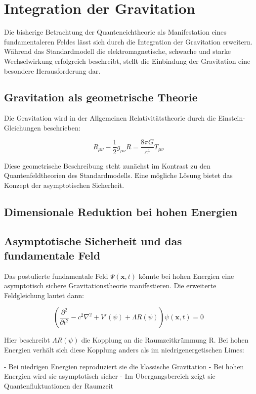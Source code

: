 \documentclass{article}
\begin{document}
\section{Integration der Gravitation}
Die bisherige Betrachtung der Quanteneichtheorie als Manifestation eines fundamentaleren Feldes lässt sich durch die Integration der Gravitation erweitern. Während das Standardmodell die elektromagnetische, schwache und starke Wechselwirkung erfolgreich beschreibt, stellt die Einbindung der Gravitation eine besondere Herausforderung dar.

\subsection{Gravitation als geometrische Theorie}
Die Gravitation wird in der Allgemeinen Relativitätstheorie durch die Einstein-Gleichungen beschrieben:

\begin{equation}
	R_{\mu\nu} - \frac{1}{2} g_{\mu\nu} R = \frac{8\pi G}{c^4} T_{\mu\nu}
\end{equation}

Diese geometrische Beschreibung steht zunächst im Kontrast zu den Quantenfeldtheorien des Standardmodells. Eine mögliche Lösung bietet das Konzept der asymptotischen Sicherheit.


\subsection{Dimensionale Reduktion bei hohen Energien}
\subsection{Asymptotische Sicherheit und das fundamentale Feld}
Das postulierte fundamentale Feld $\Psi(\mathbf{x},t)$ könnte bei hohen Energien eine asymptotisch sichere Gravitationstheorie manifestieren. Die erweiterte Feldgleichung lautet dann:

\begin{equation}
	\left( \frac{\partial^2}{\partial t^2} - c^2 \nabla^2 + V'(\psi) + \Lambda R(\psi) \right) \psi(\mathbf{x},t) = 0
\end{equation}

Hier beschreibt $\Lambda R(\psi)$ die Kopplung an die Raumzeitkrümmung R. Bei hohen Energien verhält sich diese Kopplung anders als im niedrigenergetischen Limes:

- Bei niedrigen Energien reproduziert sie die klassische Gravitation
- Bei hohen Energien wird sie asymptotisch sicher
- Im Übergangsbereich zeigt sie Quantenfluktuationen der Raumzeit
\end{document}
